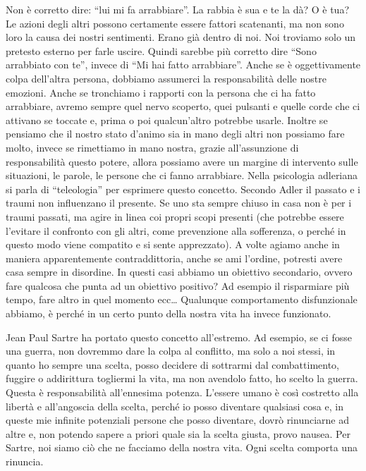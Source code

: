 \documentclass[12pt]{book} %
\begin{document}
Non è corretto dire: “lui mi fa arrabbiare”. La rabbia è sua e te la dà? O è tua? Le azioni degli altri possono
certamente essere fattori scatenanti, ma non sono loro la causa dei nostri sentimenti. Erano già dentro di noi. Noi
troviamo solo un pretesto esterno per farle uscire. Quindi sarebbe più corretto dire “Sono arrabbiato con te”, invece
di “Mi hai fatto arrabbiare”. Anche se è oggettivamente colpa dell'altra persona, dobbiamo assumerci la responsabilità delle nostre emozioni. Anche se tronchiamo i rapporti con la persona che ci ha fatto arrabbiare, avremo sempre quel nervo scoperto, quei pulsanti e quelle corde che ci attivano se toccate e, prima o poi qualcun'altro potrebbe usarle. Inoltre se pensiamo che il nostro stato d'animo sia in mano degli altri non possiamo fare molto, invece se rimettiamo in mano nostra, grazie all'assunzione di responsabilità questo potere, allora possiamo avere un margine di intervento sulle situazioni, le parole, le persone che ci fanno arrabbiare.
Nella psicologia adleriana si parla di “teleologia” per esprimere questo concetto.
Secondo Adler il passato e i traumi non influenzano il presente. Se uno sta sempre chiuso in casa non è per i traumi
passati, ma agire in linea coi propri scopi presenti (che potrebbe essere l'evitare il confronto
con gli altri, come prevenzione alla sofferenza, o perché in questo modo viene compatito e si sente apprezzato).
A volte agiamo anche in maniera apparentemente contraddittoria, anche se ami l'ordine, potresti avere casa sempre in disordine. In questi casi abbiamo un obiettivo secondario, ovvero fare qualcosa che punta ad un obiettivo positivo? Ad esempio il risparmiare più tempo, fare altro in quel momento ecc…
Qualunque comportamento disfunzionale abbiamo, è perché in un certo punto della nostra vita ha invece funzionato.

Jean Paul Sartre ha portato questo concetto all'estremo. Ad esempio, se ci fosse una guerra, non
dovremmo dare la colpa al conflitto, ma solo a noi stessi, in quanto ho sempre una scelta, posso decidere di sottrarmi
dal combattimento, fuggire o addirittura togliermi la vita, ma non avendolo fatto, ho scelto la guerra. Questa è
responsabilità all'ennesima potenza. L'essere umano è così costretto alla libertà e all'angoscia
della scelta, perché io posso diventare qualsiasi cosa e, in queste mie infinite potenziali persone che posso
diventare, dovrò rinunciarne ad altre e, non potendo sapere a priori quale sia la scelta giusta, provo nausea. Per
Sartre, noi siamo ciò che ne facciamo della nostra vita. 
Ogni scelta comporta una rinuncia. 
\end{document}
